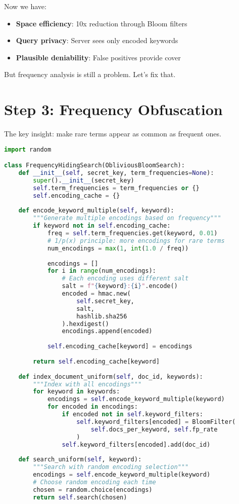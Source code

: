Now we have:
\begin{itemize}
    \item \textbf{Space efficiency}: 10x reduction through Bloom filters
    \item \textbf{Query privacy}: Server sees only encoded keywords  
    \item \textbf{Plausible deniability}: False positives provide cover
\end{itemize}

But frequency analysis is still a problem. Let's fix that.

\section{Step 3: Frequency Obfuscation}

The key insight: make rare terms appear as common as frequent ones.

\begin{lstlisting}[language=Python, caption=Multiple encodings hide frequency]
import random

class FrequencyHidingSearch(ObliviousBloomSearch):
    def __init__(self, secret_key, term_frequencies=None):
        super().__init__(secret_key)
        self.term_frequencies = term_frequencies or {}
        self.encoding_cache = {}
        
    def encode_keyword_multiple(self, keyword):
        """Generate multiple encodings based on frequency"""
        if keyword not in self.encoding_cache:
            freq = self.term_frequencies.get(keyword, 0.01)
            # 1/p(x) principle: more encodings for rare terms
            num_encodings = max(1, int(1.0 / freq))
            
            encodings = []
            for i in range(num_encodings):
                # Each encoding uses different salt
                salt = f"{keyword}:{i}".encode()
                encoded = hmac.new(
                    self.secret_key,
                    salt,
                    hashlib.sha256
                ).hexdigest()
                encodings.append(encoded)
            
            self.encoding_cache[keyword] = encodings
        
        return self.encoding_cache[keyword]
    
    def index_document_uniform(self, doc_id, keywords):
        """Index with all encodings"""
        for keyword in keywords:
            encodings = self.encode_keyword_multiple(keyword)
            for encoded in encodings:
                if encoded not in self.keyword_filters:
                    self.keyword_filters[encoded] = BloomFilter(
                        self.docs_per_keyword, self.fp_rate
                    )
                self.keyword_filters[encoded].add(doc_id)
    
    def search_uniform(self, keyword):
        """Search with random encoding selection"""
        encodings = self.encode_keyword_multiple(keyword)
        # Choose random encoding each time
        chosen = random.choice(encodings)
        return self.search(chosen)
\end{lstlisting}

